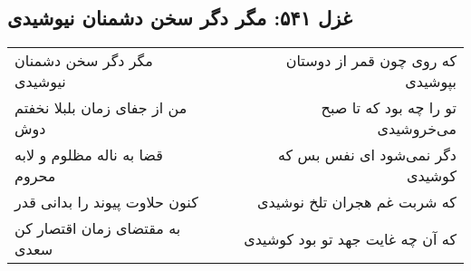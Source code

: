 \begin{center}
\section*{غزل ۵۴۱: مگر دگر سخن دشمنان نیوشیدی}
\label{sec:541}
\begin{longtable}{l p{0.5cm} r}
مگر دگر سخن دشمنان نیوشیدی
&&
که روی چون قمر از دوستان بپوشیدی
\\
من از جفای زمان بلبلا نخفتم دوش
&&
تو را چه بود که تا صبح می‌خروشیدی
\\
قضا به ناله مظلوم و لابه محروم
&&
دگر نمی‌شود ای نفس بس که کوشیدی
\\
کنون حلاوت پیوند را بدانی قدر
&&
که شربت غم هجران تلخ نوشیدی
\\
به مقتضای زمان اقتصار کن سعدی
&&
که آن چه غایت جهد تو بود کوشیدی
\\
\end{longtable}
\end{center}
